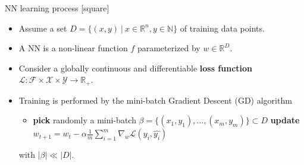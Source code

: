 \begin{frame}{NN learning process}
    [square]
    \begin{itemize}
        \item{Assume a set $D=\{(x,y)\:|\:x\in\mathbb{R}^n,y\in\mathbb{N}\}$ of training data points.}
        \vspace{0.3cm}
        \item{A NN is a non-linear function $f$ parameterized by $w\in\mathbb{R}^D$.}
        \vspace{0.3cm}
        \item{Consider a globally continuous and differentiable \textbf{loss function} $\mathcal{L}:\mathcal{F}\times\mathcal{X}\times\mathcal{Y}\rightarrow\mathbb{R}_+$.}
        \vspace{0.3cm}
        \item{Training is performed by the mini-batch Gradient Descent (GD) algorithm
        \begin{itemize}
            \item[]{
            \begin{algorithm}[H]
                \begin{algorithmic}[1]
                    \STATE \textbf{pick} randomly a mini-batch $\beta=\{(x_1,y_1),\dots,(x_m,y_m)\} \subset D$
                    \STATE \textbf{update} $w_{t+1}=w_t-\alpha\frac{1}{m}\sum_{i=1}^m\nabla_w\mathcal{L}(y_i,\hat{y_i})$
                    \ENDWHILE
                \end{algorithmic}
                \label{alg:gd}
            \end{algorithm}
            }
        \end{itemize}
        with $|\beta| \ll |D|$.}
    \end{itemize}
\end{frame}

